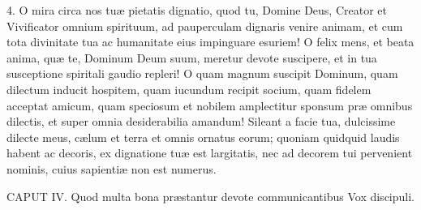 \documentclass[twoside]{article}
\begin{document}
4. O mira circa nos tuæ pietatis dignatio, quod tu, Domine Deus, Creator et Vivificator omnium spirituum, ad pauperculam dignaris venire animam, et cum tota divinitate tua ac humanitate eius impinguare esuriem! O felix mens, et beata anima, quæ te, Dominum Deum suum, meretur devote suscipere, et in tua susceptione spiritali gaudio repleri! O quam magnum suscipit Dominum, quam dilectum inducit hospitem, quam iucundum recipit socium, quam fidelem acceptat amicum, quam speciosum et nobilem amplectitur sponsum præ omnibus dilectis, et super omnia desiderabilia amandum! Sileant a facie tua, dulcissime dilecte meus, cælum et terra et omnis ornatus eorum; quoniam quidquid laudis habent ac decoris, ex dignatione tuæ est largitatis, nec ad decorem tui pervenient nominis, cuius sapientiæ non est numerus.


CAPUT IV.
Quod multa bona præstantur devote communicantibus
Vox discipuli.
\end{document}
